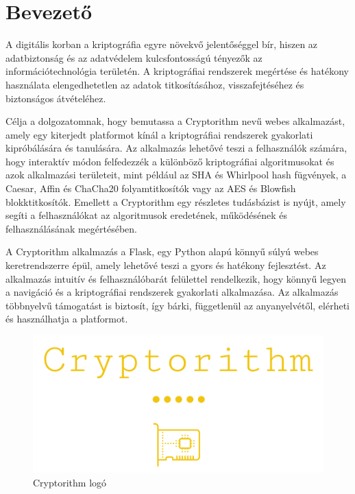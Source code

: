 \chapter{Bevezető}%

A digitális korban a kriptográfia egyre növekvő jelentőséggel bír, hiszen az adatbiztonság és az adatvédelem kulcsfontosságú tényezők az információtechnológia területén. A kriptográfiai rendszerek megértése és hatékony használata elengedhetetlen az adatok titkosításához, visszafejtéséhez és biztonságos átvételéhez.

Célja a dolgozatomnak, hogy bemutassa a Cryptorithm nevű webes alkalmazást, amely egy kiterjedt platformot kínál a kriptográfiai rendszerek gyakorlati kipróbálására és tanulására. Az alkalmazás lehetővé teszi a felhasználók számára, hogy interaktív módon felfedezzék a különböző kriptográfiai algoritmusokat és azok alkalmazási területeit, mint például az SHA és Whirlpool hash fügvények, a Caesar, Affin és ChaCha20 folyamtitkosítók vagy az AES és Blowfish blokktitkosítók. Emellett a Cryptorithm egy részletes tudásbázist is nyújt, amely segíti a felhasználókat az algoritmusok eredetének, működésének és felhasználásának megértésében.

A Cryptorithm alkalmazás a Flask, egy Python alapú könnyű súlyú webes keretrendszerre épül, amely lehetővé teszi a gyors és hatékony fejlesztést. Az alkalmazás intuitív és felhasználóbarát felülettel rendelkezik, hogy könnyű legyen a navigáció és a kriptográfiai rendszerek gyakorlati alkalmazása. Az alkalmazás többnyelvű támogatást is biztosít, így bárki, függetlenül az anyanyelvétől, elérheti és használhatja a platformot.

\begin{figure}[!h]
	\centering
	\includegraphics[scale=0.25]{images/logoCryptorithm}
	\caption{Cryptorithm logó}
\end{figure}
\pagebreak

